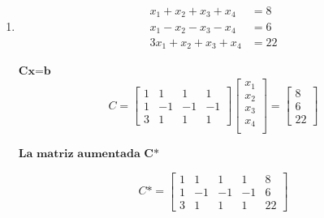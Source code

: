 \documentclass[12pt,a4paper]{report}
\begin{document}
\begin{enumerate}
\begin{enumerate}
$\textbf{La matriz aumentada B*}$

\begin{equation*}
B*=\left [
  \begin{array}{rrr|r}
1 & -1 & 2 & 2\\
1 & -1 & -1 & -1\\
2 & -2 & 1 & 2
\end{array}
\right ]
\end{equation*}

\begin{verbatim}
> B=matrix(c(1,1,2,-1,-1,-2,2,-1,1),3,3)
> b1<-matrix(c(2,-1,2),3,1)
> AumB<-cbind(B,b1)
> R(B)
[1] 2
> R(AumB)
[1] 3
\end{verbatim}

El rango de las matrices $B$ y $B*$ no es el mismo. No tiene solución.

\item 
\begin{align*}
x_{1}+x_{2}+x_{3}+x_{4}&=8\\
x_{1}-x_{2}-x_{3}-x_{4}&=6\\
3x_{1}+x_{2}+x_{3}+x_{4}&=22
\end{align*}

$\textbf{Cx=b}$
\begin{equation*}
C=\begin{bmatrix}
1 & 1 & 1 & 1\\
1 & -1 & -1 & -1\\
3 & 1 & 1 & 1
\end{bmatrix}
\begin{bmatrix}
x_{1}\\
x_{2}\\
x_{3}\\
x_{4}\\
\end{bmatrix}
=\begin{bmatrix}
8\\
6\\
22
\end{bmatrix}
\end{equation*}


$\textbf{La matriz aumentada C*}$

\begin{equation*}
C*=\left [
  \begin{array}{rrrr|r}
1 & 1 & 1 & 1 & 8\\
1 & -1 & -1 & -1 & 6\\
3 & 1 & 1 & 1 & 22
\end{array}
\right ]
\end{equation*}


\end{enumerate}
\end{enumerate}
\end{document}
